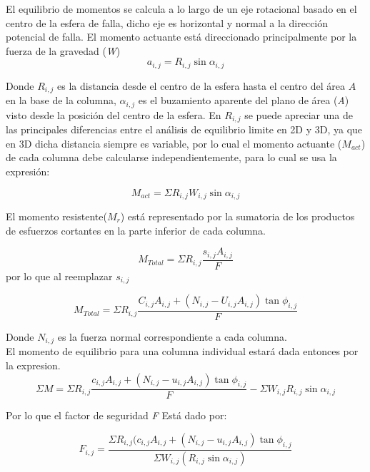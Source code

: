 El equilibrio de momentos se calcula a lo largo de un eje rotacional basado en el centro de la esfera de falla, dicho eje es horizontal y normal a la direcci\'on potencial de falla.
El momento actuante est\'a direccionado principalmente por la fuerza de la gravedad (\textit{W})
$$a_{i,j}=R_{i,j}\sin \alpha_{i,j}$$ 

Donde $\textit{R}_{i,j}$ es la distancia desde el centro de la esfera hasta el centro del \'area $\textit{A}$ en la base de la columna, $\alpha_{i,j}$ es el buzamiento aparente del plano de \'area (\textit{A}) visto desde la posici\'on del centro de la esfera. En $\textit{R}_{i,j}$ se puede apreciar una de las principales diferencias entre el an\'alisis de equilibrio limite en 2D y 3D, ya que en 3D dicha distancia siempre es variable, por lo cual el momento actuante ($\textit{M}_{act}$) de cada columna debe calcularse independientemente, para lo cual se usa la expresi\'on:

$$\textit{M}_{act}=\Sigma \textit{R}_{i,j}\textit{W}_{i,j}\sin\alpha_{i,j}  $$

El momento resistente($\textit{M}_{r}$)  est\'a representado por la sumatoria de los productos de esfuerzos cortantes en la parte inferior de cada columna.

$$\textit{M}_{Total}= \Sigma \textit{R}_{i,j}\frac{\textit{s}_{i,j}\textit{A}_{i,j}}{\textit{F}}  $$
por lo que al reemplazar $\textit{s}_{i,j}$ 

$$ {M}_{Total} = \Sigma \textit{R}_{i,j} \frac{\textit{C}_{i,j}\textit{A}_{i,j}+(\textit{N}_{i,j}-\textit{U}_{i,j}\textit{A}_{i,j})\tan\phi_{i,j}}{\textit{F}} $$

Donde $\textit{N}_{i,j}$ es la fuerza normal correspondiente a cada columna.\\

El momento de equilibrio para una columna individual estar\'a dada entonces por la expresion.
$$ \Sigma \textit{M}= \Sigma \textit{R}_{i,j} \frac{\textit{c}_{i,j}\textit{A}_{i,j}+(\textit{N}_{i,j}-\textit{u}_{i,j}\textit{A}_{i,j})\tan\phi _{i,j}}{F}-\Sigma \textit{W}_{i,j}\textit{R}_{i,j}\sin \alpha _{i,j} $$

Por lo que el factor de seguridad \textit{F} Est\'a dado por:

$$\textit{F}_{i,j}=  \frac{\Sigma \textit{R}_{i,j}(\textit{c}_{i,j}\textit{A}_{i,j}+(\textit{N}_{i,j}-\textit{u}_{i,j}\textit{A}_{i,j})\tan \phi _{i,j}}{\Sigma \textit{W} _{i,j}(\textit{R} _{i,j}\sin\alpha _{i,j})}  $$

